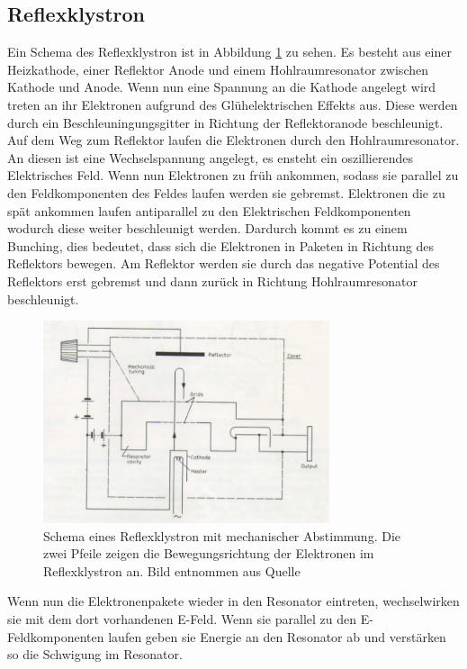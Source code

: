 \subsection{Reflexklystron}
Ein Schema des Reflexklystron ist in Abbildung \ref{fig:reflex_schema} zu sehen.
Es besteht aus einer Heizkathode, einer Reflektor Anode und einem Hohlraumresonator zwischen Kathode und Anode.
Wenn nun eine Spannung an die Kathode angelegt wird treten an ihr Elektronen aufgrund des Glühelektrischen Effekts aus.
Diese werden durch ein Beschleuningungsgitter in Richtung der Reflektoranode beschleunigt.
Auf dem Weg zum Reflektor laufen die Elektronen durch den Hohlraumresonator.
An diesen ist eine Wechselspannung angelegt, es ensteht ein oszillierendes Elektrisches Feld.
Wenn nun Elektronen zu früh ankommen, sodass sie parallel zu den Feldkomponenten des Feldes laufen werden sie gebremst.
Elektronen die zu spät ankommen laufen antiparallel zu den Elektrischen Feldkomponenten wodurch diese weiter beschleunigt werden.
Dardurch kommt es zu einem Bunching, dies bedeutet, dass sich die Elektronen in Paketen in Richtung des Reflektors bewegen.
Am Reflektor werden sie durch das negative Potential des Reflektors erst gebremst und dann zurück in Richtung Hohlraumresonator beschleunigt.
\begin{figure}
    \centering
    \includegraphics[width=0.75\textwidth]{content/data/reflex_klystron_schema.png}
    \caption{Schema eines Reflexklystron mit mechanischer Abstimmung. Die zwei Pfeile zeigen die Bewegungsrichtung der Elektronen im Reflexklystron an. Bild entnommen aus Quelle \cite[6]{Anleitung}}
    \label{fig:reflex_schema}
\end{figure}
\FloatBarrier
Wenn nun die Elektronenpakete wieder in den Resonator eintreten, wechselwirken sie mit dem dort vorhandenen E-Feld.
Wenn sie parallel zu den E-Feldkomponenten laufen geben sie Energie an den Resonator ab und verstärken so die Schwigung im Resonator.
